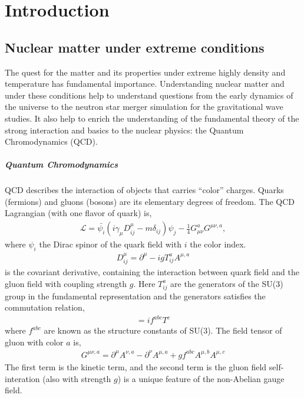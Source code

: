 \chapter{Introduction}
\section{Nuclear matter under extreme conditions}
The quest for the matter and its properties under extreme highly density and temperature has fundamental importance.
Understanding nuclear matter and under these conditions help to understand questions from the early dynamics of the universe to the neutron star merger simulation for the gravitational wave studies.
It also help to enrich the understanding of the fundamental theory of the strong interaction and basics to the nuclear physics: the Quantum Chromodynamics (QCD).

\paragraph{Quantum Chromodynamics}
QCD describes the interaction of objects that carries ``color'' charges.
Quarks (fermions) and gluons (bosons) are its elementary degrees of freedom. 
The QCD Lagrangian (with one flavor of quark) is,
\begin{eqnarray}
\mathcal{L} = \bar{\psi_i} \left(i\gamma_\mu D^\mu_{ij} -m \delta_{ij} \right)\psi_j - \frac{1}{4}G_{\mu\nu}^a G^{\mu\nu,a},
\end{eqnarray}
where $\psi_i$ the Dirac spinor of the quark field with $i$ the color index.
\begin{eqnarray}
D_{ij}^\mu = \partial^\mu - i g T_{ij}^a A^{\mu, a}
\end{eqnarray}
is the covariant derivative, containing the interaction between quark field and the gluon field with coupling strength $g$.
Here $T_{ij}^a$ are the generators of the SU(3) group in the fundamental representation and the generators satisfies the commutation relation,
\begin{eqnarray}
[T^a, T^b] = i f^{abc} T^c
\end{eqnarray}
where $f^{abc}$ are known as the structure constants of SU(3).
The field tensor of gluon with color $a$ is,
\begin{eqnarray}
G^{\mu\nu,a} = \partial^\mu A^{\nu, a} - \partial^\nu A^{\mu, a} + g f^{abc} A^{\mu,b}A^{\mu,c}
\end{eqnarray}
The first term is the kinetic term, and the second term is the gluon field self-interation (also with strength $g$) is a unique feature of the non-Abelian gauge field.

